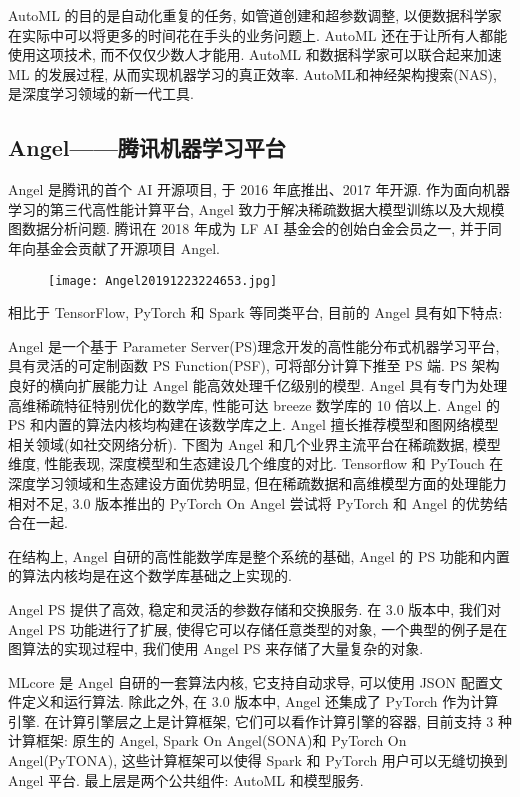 AutoML 的目的是自动化重复的任务, 如管道创建和超参数调整, 以便数据科学家在实际中可以将更多的时间花在手头的业务问题上.
AutoML 还在于让所有人都能使用这项技术, 而不仅仅少数人才能用. AutoML 和数据科学家可以联合起来加速 ML 的发展过程, 从而实现机器学习的真正效率.
AutoML和神经架构搜索(NAS), 是深度学习领域的新一代工具.
\subsection{Angel——腾讯机器学习平台}
Angel 是腾讯的首个 AI 开源项目, 于 2016 年底推出、2017 年开源. 作为面向机器学习的第三代高性能计算平台, Angel 致力于解决稀疏数据大模型训练以及大规模图数据分析问题. 腾讯在 2018 年成为 LF AI 基金会的创始白金会员之一, 并于同年向基金会贡献了开源项目 Angel.
\begin{figure}[H]
\centering
\texttt{[image: Angel20191223224653.jpg]}
\label{Angel20191223224653}
\end{figure}
相比于 TensorFlow,  PyTorch 和 Spark 等同类平台, 目前的 Angel 具有如下特点:

Angel 是一个基于 Parameter Server(PS)理念开发的高性能分布式机器学习平台, 具有灵活的可定制函数 PS Function(PSF), 可将部分计算下推至 PS 端. PS 架构良好的横向扩展能力让 Angel 能高效处理千亿级别的模型. Angel 具有专门为处理高维稀疏特征特别优化的数学库, 性能可达 breeze 数学库的 10 倍以上. Angel 的 PS 和内置的算法内核均构建在该数学库之上. Angel 擅长推荐模型和图网络模型相关领域(如社交网络分析). 下图为 Angel 和几个业界主流平台在稀疏数据, 模型维度, 性能表现, 深度模型和生态建设几个维度的对比. Tensorflow 和 PyTouch 在深度学习领域和生态建设方面优势明显, 但在稀疏数据和高维模型方面的处理能力相对不足, 3.0 版本推出的 PyTorch On Angel 尝试将 PyTorch 和 Angel 的优势结合在一起.


在结构上, Angel 自研的高性能数学库是整个系统的基础, Angel 的 PS 功能和内置的算法内核均是在这个数学库基础之上实现的.

Angel PS 提供了高效, 稳定和灵活的参数存储和交换服务. 在 3.0 版本中, 我们对 Angel PS 功能进行了扩展, 使得它可以存储任意类型的对象, 一个典型的例子是在图算法的实现过程中, 我们使用 Angel PS 来存储了大量复杂的对象.

MLcore 是 Angel 自研的一套算法内核, 它支持自动求导, 可以使用 JSON 配置文件定义和运行算法. 除此之外, 在 3.0 版本中, Angel 还集成了 PyTorch 作为计算引擎. 在计算引擎层之上是计算框架, 它们可以看作计算引擎的容器, 目前支持 3 种计算框架: 原生的 Angel, Spark On Angel(SONA)和 PyTorch On Angel(PyTONA), 这些计算框架可以使得 Spark 和 PyTorch 用户可以无缝切换到 Angel 平台. 最上层是两个公共组件: AutoML 和模型服务.

